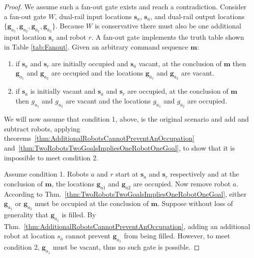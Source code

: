 \documentclass[letterpaper, 10 pt, conference]{ieeeconf}
\begin{document}
\begin{proof} We assume such a {\sc fan-out} gate exists and reach a contradiction. 
Consider a  {\sc fan-out} gate $W$,  dual-rail input locations  $\bm{s}_{a}$, $\bm{s}_{\overline{a}}$, and dual-rail output locations  $\{\bm{g}_{a_1}, \bm{g}_{a_2},\bm{g}_{\overline{a}_1},\bm{g}_{\overline{a}_2}\}$. Because $W$ is conservative there must also be one additional input location $\bm{s}_r$ and robot $r$. A {\sc fan-out} gate implements the truth table shown in Table \ref{tab:Fanout}. Given an arbitrary command sequence $\bm{m}$:  
\begin{enumerate}
\item if $\bm{s}_{a}$  and $\bm{s}_r$ are initially occupied and $\bm{s}_{\overline{a}}$ vacant, at the conclusion of $\bm{m}$ then $\bm{g}_{a_1}$ and $\bm{g}_{a_2}$ are occupied and the locations  $\bm{g}_{\overline{a}_1}$ and $\bm{g}_{\overline{a}_2}$ are vacant.
\item if $\bm{s}_{a}$ is initially vacant and $\bm{s}_{\overline{a}}$ and $\bm{s}_r$ are occupied, at the conclusion of $\bm{m}$ then $g_{a_1}$ and $g_{a_2}$ are vacant and the locations  $g_{\overline{a}_1}$ and $g_{\overline{a}_2}$ are occupied.
\end{enumerate}

We will now assume that condition 1, above, is the original scenario and  add and subtract robots, applying theorems~\ref{thm:AdditionalRobotsCannotPreventAnOccupation} and~\ref{thm:TwoRobotsTwoGoalsImpliesOneRobotOneGoal}, to show that it is impossible to meet condition 2. 

Assume condition 1. Robots $a$ and $r$ start at $\bm{s}_{a}$ and $\bm{s}_r$  respectively and at the conclusion of $\bm{m}$, the locations  $\bm{g}_{a1}$ and $\bm{g}_{a2}$ are occupied. Now remove robot $a$. According to  Thm.~\ref{thm:TwoRobotsTwoGoalsImpliesOneRobotOneGoal}, either $\bm{g}_{a_1}$ or $\bm{g}_{a_2}$ must be occupied at the conclusion of $\bm{m}$. Suppose without loss of generality that $\bm{g}_{a_1}$ is filled.  By Thm.~\ref{thm:AdditionalRobotsCannotPreventAnOccupation}, adding an additional robot at location $s_{\overline{a}}$ cannot prevent $\bm{g}_{a_1}$ from being filled. However, to meet condition 2, $\bm{g}_{a_1}$ must be vacant, thus no such gate is possible. 
 \end{proof}

\end{document}
